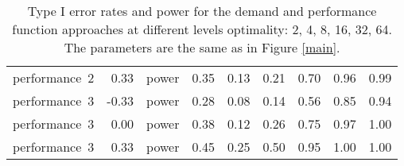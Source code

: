 \begin{table}[ht]
\begin{tabular}{lrlrrrrrr}
  performance~2 & 0.33 & power & 0.35 & 0.13 & 0.21 & 0.70 & 0.96 & 0.99 \\ 
  performance~3 & -0.33 & power & 0.28 & 0.08 & 0.14 & 0.56 & 0.85 & 0.94 \\ 
  performance~3 & 0.00 & power & 0.38 & 0.12 & 0.26 & 0.75 & 0.97 & 1.00 \\ 
  performance~3 & 0.33 & power & 0.45 & 0.25 & 0.50 & 0.95 & 1.00 & 1.00 \\ 
   \hline
\end{tabular}
\endgroup
\caption{Type I error rates and power for the demand and
             performance function approaches at different levels optimality: 
             2, 4, 8, 16, 32, 64. The parameters are the same as in Figure 
             \ref{main}.} 
\label{main-table}
\end{table}
